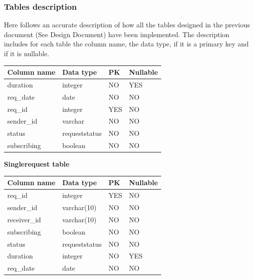 \documentclass[titlepage]{article}
\begin{document}
	\subsubsection{Tables description}
	Here follows an accurate description of how all the tables designed in the previous document (See Design Document) have been implemented. The description includes for each table the column name, the data type, if it is a primary key and if it is nullable.
	\newline
	\newline
	\renewcommand*{\arraystretch}{1.4}
	\begin{longtable}{| p{3 cm} | p{2 cm} | p{2 cm} | p{2 cm} |} \hline
		Column name & Data type & PK & Nullable \\ \hline
		duration & integer & NO & YES \\ \hline
		req\_date & date & NO & NO \\ \hline
		req\_id & integer & YES & NO \\ \hline
		sender\_id & varchar & NO & NO \\ \hline
		status & requeststatus & NO & NO \\ \hline
		subscribing & boolean & NO & NO \\ \hline
	\end{longtable}
	
	\vspace{\baselineskip}
	\vspace{\baselineskip}
	
	{\bf Singlerequest table} 
	\renewcommand*{\arraystretch}{1.4}
	\begin{longtable}{| p{3 cm} | p{2 cm} | p{2 cm} | p{2 cm} |} \hline
		Column name & Data type & PK & Nullable \\ \hline
		req\_id & integer & YES & NO \\ \hline
		sender\_id & varchar(10) & NO & NO \\ \hline
		receiver\_id & varchar(10) & NO & NO \\ \hline
		subscribing & boolean & NO & NO \\ \hline
		status & requeststatus & NO & NO \\ \hline
		duration & integer & NO & YES \\ \hline
		req\_date & date & NO & NO \\ \hline
	\end{longtable}
	
	\vspace{\baselineskip}
	\vspace{\baselineskip}
	
\end{document}
